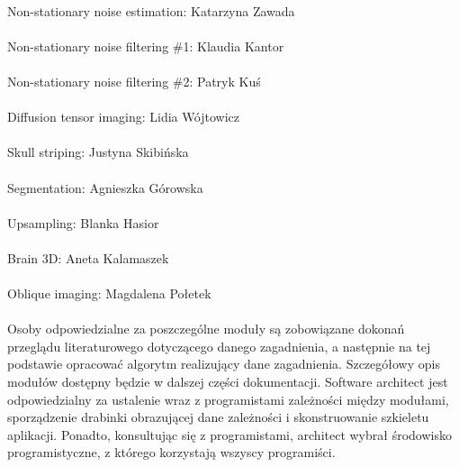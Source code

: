 \documentclass[12]{article}
\begin{document}
	\paragraph{}
	Non-stationary noise estimation: Katarzyna Zawada
	\paragraph{}
	Non-stationary noise filtering \#1: Klaudia Kantor
	\paragraph{}
	Non-stationary noise filtering \#2: Patryk Kuś
	\paragraph{}
	Diffusion tensor imaging: Lidia Wójtowicz
	\paragraph{}
	Skull striping: Justyna Skibińska
	\paragraph{}
	Segmentation: Agnieszka Górowska
	\paragraph{}
	Upsampling: Blanka Hasior
	\paragraph{}
	Brain 3D: Aneta Kalamaszek
	\paragraph{}
	Oblique imaging: Magdalena Połetek
	\paragraph{}
	Osoby odpowiedzialne za poszczególne moduły są zobowiązane dokonań przeglądu literaturowego dotyczącego danego zagadnienia, a następnie na tej podstawie opracować algorytm realizujący dane zagadnienia. Szczegółowy opis modułów dostępny będzie w dalszej części dokumentacji.
	Software architect jest odpowiedzialny za ustalenie wraz z programistami zależności między modułami, sporządzenie drabinki obrazującej dane zależności i skonstruowanie szkieletu aplikacji. Ponadto, konsultując się z programistami, architect wybrał środowisko programistyczne, z którego korzystają wszyscy programiści.
\end{document}
